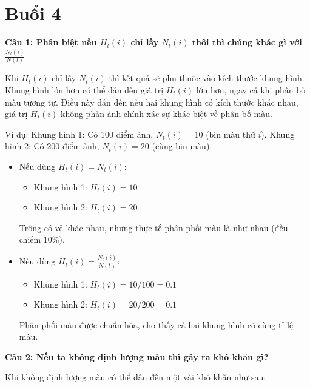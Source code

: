 \section{Buổi 4}

\textbf{Câu 1: Phân biệt nếu $H_t(i)$ chỉ lấy $N_t(i)$ thôi thì chúng khác gì với $\frac{N_t(i)}{N(t)}$}

Khi $H_t(i)$ chỉ lấy $N_t(i)$ thì kết quả sẽ phụ thuộc vào kích thước khung hình. Khung hình lớn hơn có thể dẫn đến giá trị $H_t(i)$ lớn hơn, ngay cả khi phân bố màu tương tự. Điều này dẫn đến nếu hai khung hình có kích thước khác nhau, giá trị $H_t(i)$ không phản ánh chính xác sự khác biệt về phân bố màu.

Ví dụ: Khung hình 1: Có 100 điểm ảnh, $N_t(i)=10$ (bin màu thứ $i$). Khung hình 2: Có 200 điểm ảnh, $N_t(i)=20$ (cùng bin màu).

\begin{itemize}
	\item Nếu dùng $H_t(i) = N_t(i)$:
	
	\begin{itemize}
		\item Khung hình 1: $H_t(i)=10$
		
		\item Khung hình 2: $H_t(i)=20$
	\end{itemize}
		
	Trông có vẻ khác nhau, nhưng thực tế phân phối màu là như nhau (đều chiếm 10\%).
		
	\item Nếu dùng $H_t(i) = \frac{N_t(i)}{N(t)}$:
	
	\begin{itemize}
		\item Khung hình 1: $H_t(i) = 10/100 = 0.1$
		
		\item Khung hình 2: $H_t(i) = 20/200 = 0.1$
	\end{itemize}
	
	Phân phối màu được chuẩn hóa, cho thấy cả hai khung hình có cùng tỉ lệ màu.
\end{itemize}

\textbf{Câu 2: Nếu ta không định lượng màu thì gây ra khó khăn gì?}

Khi không định lượng màu có thể dẫn đến một vài khó khăn như sau:

